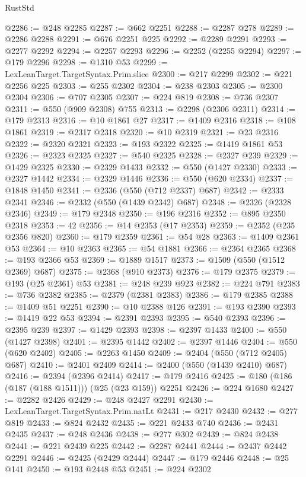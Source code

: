 \begin{lexlean}{RustStd}
\begin{coremodule}
@2286 := @248 @2285
@2287 := @662 @2251
@2288 := @2287 @278
@2289 := @2286 @2288
@2291 := @676 @2251 @225
@2292 := @2289 @2291
@2293 := @2277 @2292
@2294 := @2257 @2293
@2296 := @2252 (@2255 @2294)
@2297 := @179 @2296
@2298 := @1310 @53
@2299 := LexLeanTarget.TargetSyntax.Prim.slice
@2300 := @217 @2299
@2302 := @221 @2256 @225
@2303 := @255 @2302
@2304 := @238 @2303
@2305 := @2300 @2304
@2306 := @707 @2305
@2307 := @224 @819
@2308 := @736 @2307
@2311 := @550 (@909 @2308) @755
@2313 := @2298 (@2306 @2311)
@2314 := @179 @2313
@2316 := @10 @1861 @27
@2317 := @1409 @2316
@2318 := @108 @1861
@2319 := @2317 @2318
@2320 := @10 @2319
@2321 := @23 @2316
@2322 := @2320 @2321
@2323 := @193 @2322
@2325 := @1419 @1861 @53
@2326 := @2323 @2325
@2327 := @540 @2325
@2328 := @2327 @239
@2329 := @1429 @2325
@2330 := @2329 @1433
@2332 := @550 (@1427 @2330)
@2333 := @2327 @1442
@2334 := @2329 @1446
@2336 := @550 (@620 @2334)
@2337 := @1848 @1450
@2341 := @2336 (@550 (@712 @2337) @687)
@2342 := @2333 @2341
@2346 := @2332 (@550 (@1439 @2342) @687)
@2348 := @2326 (@2328 @2346)
@2349 := @179 @2348
@2350 := @196 @2316
@2352 := @895 @2350 @2318
@2353 := 42
@2356 := @14 @2353 (@17 @2353)
@2359 := @2352 (@235 @2356 @820)
@2360 := @179 @2359
@2361 := @54 @28
@2363 := @1409 @2361 @53
@2364 := @10 @2363
@2365 := @54 @1881
@2366 := @2364 @2365
@2368 := @193 @2366 @53
@2369 := @1889 @1517
@2373 := @1509 (@550 (@1512 @2369) @687)
@2375 := @2368 (@910 @2373)
@2376 := @179 @2375
@2379 := @193 (@25 @2361) @53
@2381 := @248 @239 @923
@2382 := @224 @791
@2383 := @736 @2382
@2385 := @2379 (@2381 @2383)
@2386 := @179 @2385
@2388 := @1409 @51 @2251
@2390 := @10 @2388 @126
@2391 := @193 @2390
@2393 := @1419 @22 @53
@2394 := @2391 @2393
@2395 := @540 @2393
@2396 := @2395 @239
@2397 := @1429 @2393
@2398 := @2397 @1433
@2400 := @550 (@1427 @2398)
@2401 := @2395 @1442
@2402 := @2397 @1446
@2404 := @550 (@620 @2402)
@2405 := @2263 @1450
@2409 := @2404 (@550 (@712 @2405) @687)
@2410 := @2401 @2409
@2414 := @2400 (@550 (@1439 @2410) @687)
@2416 := @2394 (@2396 @2414)
@2417 := @179 @2416
@2425 := @180 (@186 (@187 (@188 @1511))) (@25 (@23 @159)) @2251
@2426 := @224 @1680
@2427 := @2282 @2426
@2429 := @248 @2427 @2291
@2430 := LexLeanTarget.TargetSyntax.Prim.natLt
@2431 := @217 @2430
@2432 := @277 @819
@2433 := @824 @2432
@2435 := @221 @2433 @740
@2436 := @2431 @2435
@2437 := @248 @2436
@2438 := @277 @302
@2439 := @824 @2438
@2441 := @221 @2439 @225
@2442 := @2287 @2441
@2444 := @2437 @2442 @2291
@2446 := @2425 (@2429 @2444)
@2447 := @179 @2446
@2448 := @25 @141
@2450 := @193 @2448 @53
@2451 := @224 @2302

\end{coremodule}
\end{lexlean}
